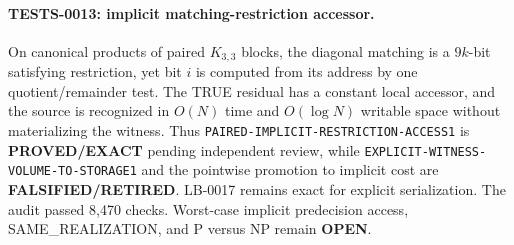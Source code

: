 \paragraph{TESTS-0013: implicit matching-restriction accessor.}
On canonical products of paired $K_{3,3}$ blocks, the diagonal matching is a
$9k$-bit satisfying restriction, yet bit $i$ is computed from its address by
one quotient/remainder test.  The TRUE residual has a constant local
accessor, and the source is recognized in $O(N)$ time and $O(\log N)$
writable space without materializing the witness.  Thus
\texttt{PAIRED-IMPLICIT-RESTRICTION-ACCESS1} is \textbf{PROVED/EXACT}
pending independent review, while
\texttt{EXPLICIT-WITNESS-VOLUME-TO-STORAGE1} and the pointwise promotion to
implicit cost are \textbf{FALSIFIED/RETIRED}.  LB-0017 remains exact for
explicit serialization.  The audit passed 8,470 checks.  Worst-case
implicit predecision access, SAME\_REALIZATION, and P versus NP remain
\textbf{OPEN}.

